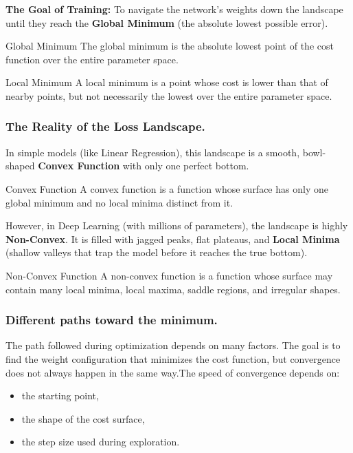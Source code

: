 \documentclass[11pt]{article}
\theoremstyle{smallexample}
\begin{document}
\textbf{The Goal of Training:} To navigate the network's weights down the landscape until they reach the \textbf{Global Minimum} (the absolute lowest possible error).


 \begin{defbox}{Global Minimum}
 The global minimum is the absolute lowest point of the cost function over the entire parameter space.
 \end{defbox}

 \begin{defbox}{Local Minimum}
 A local minimum is a point whose cost is lower than that of nearby points, but not necessarily the lowest over the entire parameter space.
 \end{defbox}


\subsubsection{The Reality of the Loss Landscape.}
In simple models (like Linear Regression), this landscape is a smooth, bowl-shaped \textbf{Convex Function} with only one perfect bottom. 

 \begin{defbox}{Convex Function}
 A convex function is a function whose surface has only one global minimum and no local minima distinct from it.
 \end{defbox}

However, in Deep Learning (with millions of parameters), the landscape is highly \textbf{Non-Convex}. It is filled with jagged peaks, flat plateaus, and \textbf{Local Minima} (shallow valleys that trap the model before it reaches the true bottom). 

 \begin{defbox}{Non-Convex Function}
 A non-convex function is a function whose surface may contain many local minima, local maxima, saddle regions, and irregular shapes.
 \end{defbox}


\subsubsection{Different paths toward the minimum.}
The path followed during optimization depends on many factors. The goal is to find the weight configuration that minimizes the cost function, but convergence does not always happen in the same way.The speed of convergence depends on:
 \begin{itemize}
  \item the starting point,
  \item the shape of the cost surface,
  \item the step size used during exploration.
 \end{itemize}
\end{document}
